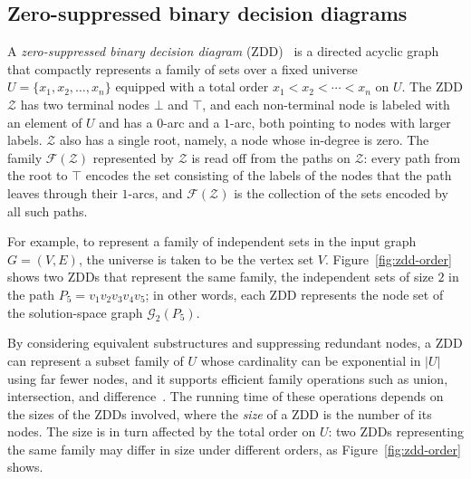 \documentclass[conference]{IEEEtran}
\newcommand{\solgraph}[2]{\mathcal{G}_{#1}(#2)}
\newcommand{\Z}{\mathcal{Z}}
\newcommand{\sets}{\mathcal{F}}
\begin{document}
\subsection{Zero-suppressed binary decision diagrams}
\label{subsec:zdd_def}

A \emph{zero-suppressed binary decision diagram} (ZDD)~\cite{Minato1993,knuth:taocp41} is a directed acyclic
graph that compactly represents a family of sets over a fixed universe
$U = \{x_1, x_2, \dots, x_n\}$ equipped with a total order $x_1 < x_2 < \cdots < x_n$ on $U$.
The ZDD $\Z$ has two terminal nodes $\bot$ and $\top$, and each non-terminal
node is labeled with an element of $U$ and has a $0$-arc and a $1$-arc, both pointing to nodes with larger labels. 
$\Z$ also has a single root, namely, a node whose in-degree is zero.
The family $\sets(\Z)$ represented by $\Z$ is read off from the paths on $\Z$: every path
from the root to $\top$ encodes the set consisting of the labels of the nodes
that the path leaves through their $1$-arcs, and $\sets(\Z)$ is the collection of
the sets encoded by all such paths. 

For example, to represent a family of independent sets in the input graph $G = (V,E)$, the universe is taken to be the vertex set $V$.
Figure~\ref{fig:zdd-order} shows two ZDDs that represent the same family, the independent sets of size $2$ in the path $P_5 = v_1 v_2 v_3 v_4 v_5$; in other words, each ZDD represents the node set of the solution-space graph $\solgraph{2}{P_5}$.

By considering equivalent substructures and suppressing redundant nodes, a ZDD can
represent a subset family of $U$ whose cardinality can be exponential in $|U|$
using far fewer nodes, and it supports efficient family operations such as union,
intersection, and difference~\cite{Minato1993,knuth:taocp41}. The running time of these operations depends on the sizes of the ZDDs involved,
where the \emph{size} of a ZDD is the number of its nodes. The size is in turn affected
by the total order on $U$: two ZDDs representing the same family
may differ in size under different orders, as Figure~\ref{fig:zdd-order} shows.
\end{document}
